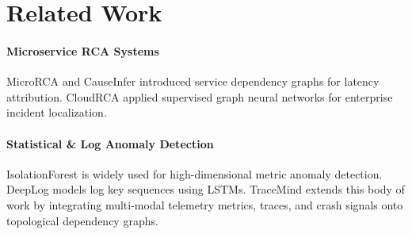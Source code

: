 \section{Related Work}
\label{sec:related_work}

\paragraph{Microservice RCA Systems}
MicroRCA \cite{wu2020microrca} and CauseInfer \cite{chen2014causeinfer} introduced service dependency graphs for latency attribution. CloudRCA \cite{meng2020cloudrca} applied supervised graph neural networks for enterprise incident localization.

\paragraph{Statistical & Log Anomaly Detection}
IsolationForest \cite{liu2008isolation} is widely used for high-dimensional metric anomaly detection. DeepLog \cite{du2017deeplog} models log key sequences using LSTMs. TraceMind extends this body of work by integrating multi-modal telemetry metrics, traces, and crash signals onto topological dependency graphs.
